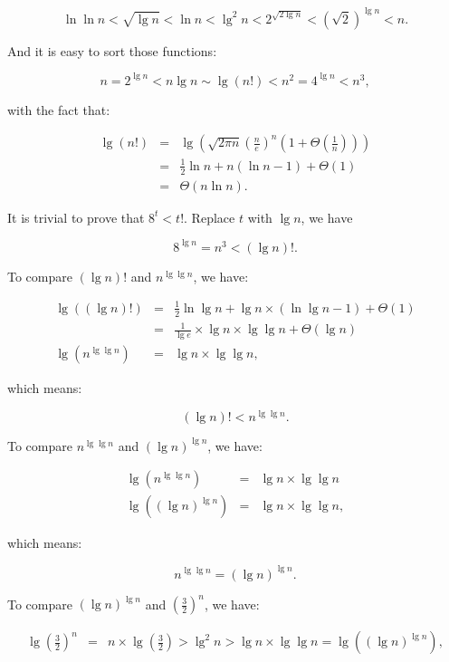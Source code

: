 \documentclass{article}
\begin{document}
\begin{description}
\begin{equation}
\ln \ln n  < \sqrt{\lg n} < \ln n < \lg^2 n < 2^{\sqrt{2\lg n}} < \left(\sqrt{2}\right)^{\lg n}  < n.
\end{equation}

And it is easy to sort those functions:

\begin{equation}
n = 2^{\lg n} < n \lg n \sim \lg\left(n !\right) < n^2 = 4^{\lg n} < n^3,
\end{equation}

with the fact that:

\begin{eqnarray*}
\lg (n!) &=& \lg \left(\sqrt{2\pi n} \left(\frac{n}{e}\right)^n\left(1 + \Theta\left(\frac{1}{n}\right)\right)\right)\\
&=& \frac{1}{2}\ln n + n(\ln n - 1) + \Theta(1)\\
&=& \Theta(n \ln n).
\end{eqnarray*}

It is trivial to prove that $8^t < t!$. Replace $t$ with $\lg n$, we have

$$8^{\lg n} = n^3 < (\lg n)!.$$

To compare $(\lg n)!$ and $n^{\lg \lg n}$,  we have:

\begin{eqnarray*}
\lg \left((\lg n)! \right) &=& \frac{1}{2} \ln \lg n + \lg n \times (\ln \lg n - 1) + \Theta(1)\\
&=& \frac{1}{\lg e}\times \lg n \times \lg \lg n + \Theta(\lg n)\\
\lg \left(n^{\lg \lg n}\right) &=& \lg n \times \lg \lg n,
\end{eqnarray*}

which means:

$$(\lg n)! < n^{\lg \lg n}.$$

To compare $ n^{\lg \lg n}$ and $(\lg n)^{\lg n}$, we have:

\begin{eqnarray*}
\lg \left(n ^ {\lg \lg n}\right) &=& \lg n \times \lg \lg n\\
\lg \left(\left(\lg n\right)^{\lg n}\right) &=& \lg n \times \lg \lg n,
\end{eqnarray*}

which means:

$$ n^{\lg \lg n}  = (\lg n)^{\lg n}.$$

To compare $(\lg n)^{\lg n}$ and $\left(\frac{3}{2}\right)^n$, we have:

\begin{eqnarray*}
\lg \left( \frac{3}{2}\right)^n &=& n\times \lg \left(\frac{3}{2}\right) > \lg^2 n > \lg n\times \lg \lg n = \lg \left(\left(\lg n\right)^{\lg n}\right),
\end{eqnarray*}


\end{description}
\end{document}
